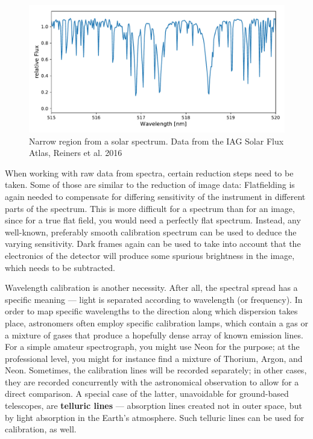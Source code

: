 \documentclass[twocolumn,apj]{openjournal}
\begin{document}
\begin{figure}[htbp]
\begin{center}
\includegraphics[width=\linewidth]{solar-spectrum-part.pdf}
\caption{Narrow region from a solar spectrum. Data from the IAG Solar Flux Atlas, Reiners et al. 2016}
\label{SpectralCurveDetail}
\end{center}
\end{figure}

When working with raw data from spectra, certain reduction steps need to be taken. Some of those are similar to the reduction of image data: Flatfielding is again needed to compensate for differing sensitivity of the instrument in different parts of the spectrum. This is more difficult for a spectrum than for an image, since for a true flat field, you would need a perfectly flat spectrum. Instead, any well-known, preferably smooth calibration spectrum can be used to deduce the varying sensitivity. Dark frames again can be used to take into account that the electronics of the detector will produce some spurious brightness in the image, which needs to be subtracted.

Wavelength calibration is another necessity. After all, the spectral spread has a specific meaning --- light is separated according to wavelength (or frequency). In order to map specific wavelengths to the direction along which dispersion takes place, astronomers often employ specific calibration lamps, which contain a gas or a mixture of gases that produce a hopefully dense array of known emission lines. For a simple amateur spectrograph, you might use Neon for the purpose; at the professional level, you might for instance find a mixture of Thorium, Argon, and Neon. Sometimes, the calibration lines will be recorded separately; in other cases, they are recorded concurrently with the astronomical observation to allow for a direct comparison. A special case of the latter, unavoidable for ground-based telescopes, are {\bf telluric lines} --- absorption lines created not in outer space, but by light absorption in the Earth's atmosphere. Such telluric lines can be used for calibration, as well.
\end{document}
